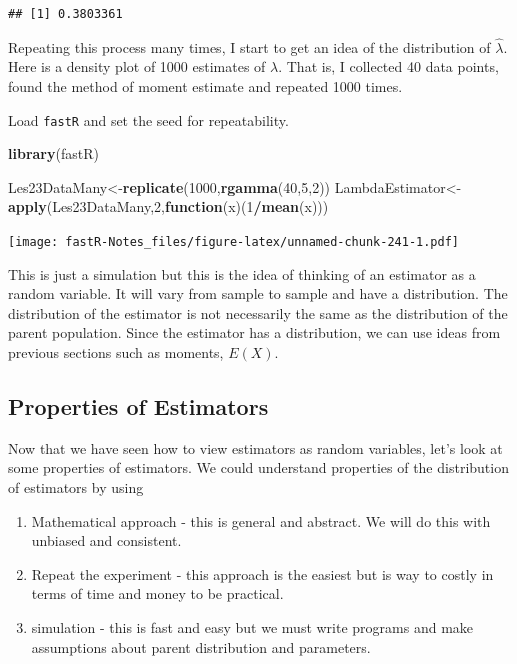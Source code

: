 \documentclass[]{book}
\newenvironment{Shaded}{\begin{snugshade}}{\end{snugshade}}
\newcommand{\KeywordTok}[1]{\textcolor[rgb]{0.13,0.29,0.53}{\textbf{#1}}}
\newcommand{\DecValTok}[1]{\textcolor[rgb]{0.00,0.00,0.81}{#1}}
\newcommand{\ControlFlowTok}[1]{\textcolor[rgb]{0.13,0.29,0.53}{\textbf{#1}}}
\newcommand{\OperatorTok}[1]{\textcolor[rgb]{0.81,0.36,0.00}{\textbf{#1}}}
\newcommand{\NormalTok}[1]{#1}
\providecommand{\tightlist}{%
  \setlength{\itemsep}{0pt}\setlength{\parskip}{0pt}}
\theoremstyle{definition}
\theoremstyle{definition}
\theoremstyle{definition}
\theoremstyle{remark}
\begin{document}
\begin{verbatim}
## [1] 0.3803361
\end{verbatim}

Repeating this process many times, I start to get an idea of the
distribution of \(\hat{\lambda}\). Here is a density plot of 1000
estimates of \(\lambda\). That is, I collected 40 data points, found the
method of moment estimate and repeated 1000 times.

Load \texttt{fastR} and set the seed for repeatability.

\begin{Shaded}
\begin{Highlighting}[]
\KeywordTok{library}\NormalTok{(fastR) }
\end{Highlighting}
\end{Shaded}

\begin{Shaded}
\begin{Highlighting}[]
\NormalTok{Les23DataMany<-}\KeywordTok{replicate}\NormalTok{(}\DecValTok{1000}\NormalTok{,}\KeywordTok{rgamma}\NormalTok{(}\DecValTok{40}\NormalTok{,}\DecValTok{5}\NormalTok{,}\DecValTok{2}\NormalTok{))}
\NormalTok{LambdaEstimator<-}\KeywordTok{apply}\NormalTok{(Les23DataMany,}\DecValTok{2}\NormalTok{,}\ControlFlowTok{function}\NormalTok{(x)(}\DecValTok{1}\OperatorTok{/}\KeywordTok{mean}\NormalTok{(x)))}
\end{Highlighting}
\end{Shaded}

\texttt{[image: fastR-Notes\_files/figure-latex/unnamed-chunk-241-1.pdf]}

This is just a simulation but this is the idea of thinking of an
estimator as a random variable. It will vary from sample to sample and
have a distribution. The distribution of the estimator is not
necessarily the same as the distribution of the parent population. Since
the estimator has a distribution, we can use ideas from previous
sections such as moments, \(E(X)\).

\subsection{Properties of Estimators}\label{properties-of-estimators}

Now that we have seen how to view estimators as random variables, let's
look at some properties of estimators. We could understand properties of
the distribution of estimators by using

\begin{enumerate}
\def\labelenumi{\arabic{enumi}.}
\tightlist
\item
  Mathematical approach - this is general and abstract. We will do this
  with unbiased and consistent.\\
\item
  Repeat the experiment - this approach is the easiest but is way to
  costly in terms of time and money to be practical.\\
\item
  simulation - this is fast and easy but we must write programs and make
  assumptions about parent distribution and parameters.
\end{enumerate}
\end{document}
